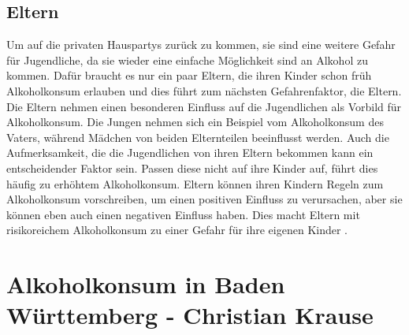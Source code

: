 \documentclass[12pt]{article}
\begin{document}
\subsection{Eltern}
Um auf die privaten Hauspartys zurück zu kommen, sie sind eine weitere Gefahr für Jugendliche, da sie wieder eine einfache Möglichkeit sind an Alkohol zu kommen. Dafür braucht es nur ein paar Eltern, die ihren Kinder schon früh Alkoholkonsum erlauben und dies führt zum nächsten Gefahrenfaktor, die Eltern. Die Eltern nehmen einen besonderen Einfluss auf die Jugendlichen als Vorbild für Alkoholkonsum. Die Jungen nehmen sich ein Beispiel vom Alkoholkonsum des Vaters, während Mädchen von beiden Elternteilen beeinflusst werden. Auch die Aufmerksamkeit, die die Jugendlichen von ihren Eltern bekommen kann ein entscheidender Faktor sein. Passen diese nicht auf ihre Kinder auf, führt dies häufig zu erhöhtem Alkoholkonsum. Eltern können ihren Kindern Regeln zum Alkoholkonsum vorschreiben, um einen positiven Einfluss zu verursachen, aber sie können eben auch einen negativen Einfluss haben. Dies macht Eltern mit risikoreichem Alkoholkonsum zu einer Gefahr für ihre eigenen Kinder \autocite[27]{kuhn_empfehlungen_nodate}. \\



\section{Alkoholkonsum in Baden Württemberg \footnotesize{- Christian Krause}}
\end{document}
